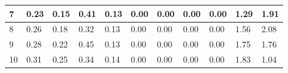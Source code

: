 {\begin{landscape}
\begin{table}[h]
\begin{tabular}{|p{0.8cm}|p{1.8cm}|p{1.8cm}|p{1.8cm}|p{1.8cm}|p{1.8cm}|p{1.8cm}|p{1.8cm}|p{1.8cm}|p{1.8cm}|p{1.8cm}|}
\multicolumn{1}{|l|}{7}        & 0.23                   & 0.15                   & 0.41                 & 0.13        & 0.00              & 0.00               & 0.00               & 0.00                & 1.29              & 1.91                    \\ \hline
\multicolumn{1}{|l|}{8}        & 0.26                   & 0.18                   & 0.32                 & 0.13        & 0.00              & 0.00               & 0.00               & 0.00                & 1.56              & 2.08                    \\ \hline
\multicolumn{1}{|l|}{9}        & 0.28                   & 0.22                   & 0.45                 & 0.13        & 0.00              & 0.00               & 0.00               & 0.00                & 1.75              & 1.76                    \\ \hline
\multicolumn{1}{|l|}{10}       & 0.31                   & 0.25                   & 0.34                 & 0.14        & 0.00              & 0.00               & 0.00               & 0.00                & 1.83              & 1.04                    \\ \hline
\end{tabular}
\end{table}
\end{landscape}}

